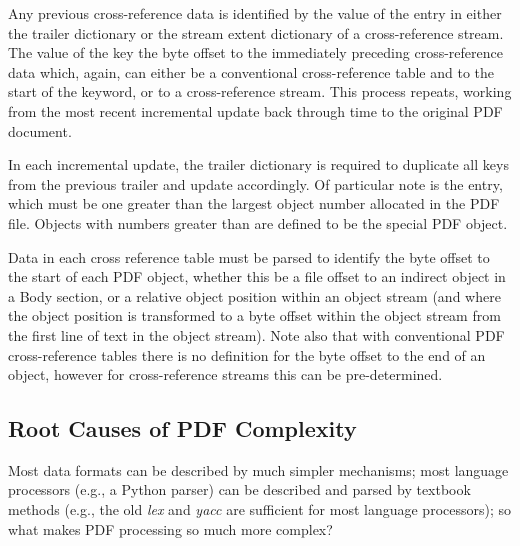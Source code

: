 Any previous cross-reference data is identified by the value of the  entry in either
the trailer dictionary or the stream extent dictionary of a cross-reference stream. The
value of the  key the byte offset to the immediately
preceding cross-reference data which, again, can either be a conventional
cross-reference table and to the start of the  keyword, or to a
cross-reference stream. This process repeats, working from the most recent incremental
update back through time to the original PDF document.

In each incremental update, the trailer dictionary is required to duplicate all keys from the previous
trailer and update accordingly. Of particular note is the  entry, which must be
one greater than the largest object number allocated in the PDF file. Objects with numbers greater
than  are defined to be the special PDF  object.

Data in each cross reference table must be parsed to
identify the byte offset to the start of each PDF object, whether this be a file offset to an indirect object in a Body section, or a relative object position within an object stream (and where the object position is transformed to a byte offset within the object stream from the first line of text in the object stream). Note also that with conventional PDF cross-reference tables there is no definition for the byte offset to the end of an object, however for cross-reference streams this can be pre-determined.

\subsection{Root Causes of PDF Complexity}
\label{sec:rootcause}

Most data formats can be described by much simpler mechanisms;
most language processors (e.g., a Python parser) can be described and parsed by
textbook methods (e.g., the old \emph{lex} and \emph{yacc} are sufficient for
most language processors);
so what makes PDF processing so much more complex?

